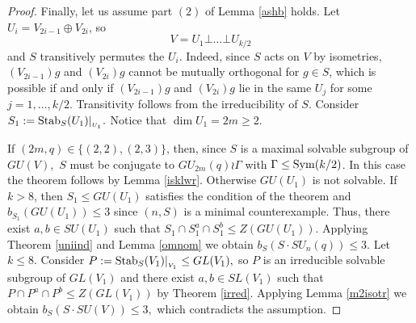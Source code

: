 \begin{proof}
Finally, let us assume part $(2)$ of  Lemma \ref{ashb} holds. Let $U_i=V_{2i-1} \oplus V_{2i}$, so 
$$V=U_1 \bot \ldots \bot U_{k/2}$$
 and $S$ transitively permutes the $U_i$. Indeed, since $S$ acts on $V$ by isometries, $(V_{2i-1})g$ and $(V_{2i})g$ cannot be mutually orthogonal for $g \in S$, which is possible if and only if      $(V_{2i-1})g$ and $(V_{2i})g$ lie in the same $U_j$ for some $j =1, \ldots, k/2.$ Transitivity follows from the irreducibility of $S.$ Consider $S_1:= \mathrm{Stab}_S(U_1)|_{_{U_1}}.$ 
Notice that $\dim U_1 = 2m \ge 2.$ 

If $(2m, q) \in \{(2,2), (2,3)\}$, then, since $S$ is a maximal solvable subgroup of $GU(V),$ $S$ must be conjugate to $GU_{2m}(q) \wr \Gamma$ with $\Gamma \le \mathrm{Sym}(k/2)$. In this case the theorem follows by Lemma \ref{isklwr}. Otherwise $GU(U_1)$ is not solvable. If $k>8$, then  $S_1\le GU(U_1)$ satisfies the condition of the theorem 
 and $b_{S_1}(GU(U_1)) \le 3$ since $(n,S)$ is a minimal counterexample. Thus, there exist $a,b \in SU(U_1)$ such that $S_1 \cap S_1^a \cap S_1^b \le Z(GU(U_1))$. Applying Theorem \ref{uniind} and Lemma \ref{omnom} we obtain 
$b_S(S \cdot SU_n(q))\le 3.$
Let $k \le 8$. Consider $P:= \mathrm{Stab}_S(V_1)|_{_{V_1}} \le GL(V_1),$ so $P$ is an irreducible solvable  subgroup of $GL(V_1)$ and  there exist $a,b \in SL(V_1)$ such that $P \cap P^a \cap P^b \le Z(GL(V_1))$ by Theorem \ref{irred}. Applying Lemma \ref{m2isotr} 
we obtain $b_S(S \cdot SU(V))\le 3,$ which contradicts the assumption.
\end{proof}

